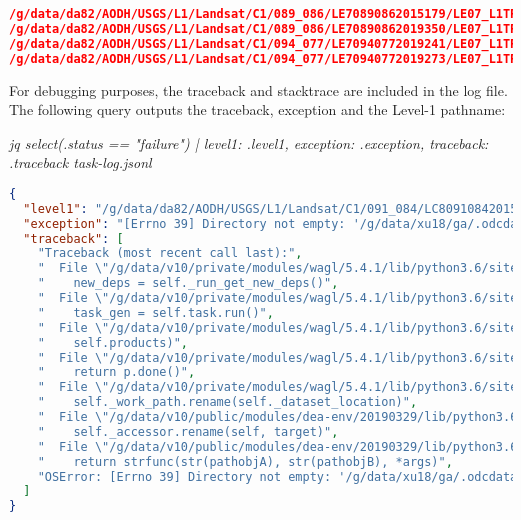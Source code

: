 \documentclass[a4paper,oneside,titlepage]{article}
\begin{document}
    \begin{lstlisting}[basicstyle=\tiny, language=json]
/g/data/da82/AODH/USGS/L1/Landsat/C1/089_086/LE70890862015179/LE07_L1TP_089086_20150628_20161024_01_T1.tar
/g/data/da82/AODH/USGS/L1/Landsat/C1/089_086/LE70890862019350/LE07_L1TP_089086_20191216_20200112_01_T1.tar
/g/data/da82/AODH/USGS/L1/Landsat/C1/094_077/LE70940772019241/LE07_L1TP_094077_20190829_20190924_01_T1.tar
/g/data/da82/AODH/USGS/L1/Landsat/C1/094_077/LE70940772019273/LE07_L1TP_094077_20190930_20191027_01_T1.tar
    \end{lstlisting}

    \begin{flushleft}
      For debugging purposes, the traceback and stacktrace are included in the log file.  The following query outputs the traceback, exception and the Level-1 pathname: \par
      \textit{{\tiny jq select(.status == "failure") |
      {level1: .level1, exception: .exception, traceback: .traceback} task-log.jsonl}}
    \end{flushleft}

    \begin{lstlisting}[basicstyle=\tiny, language=json]
{
  "level1": "/g/data/da82/AODH/USGS/L1/Landsat/C1/091_084/LC80910842015025LGN02/LC08_L1TP_091084_20150125_20180203_01_T1.tar",
  "exception": "[Errno 39] Directory not empty: '/g/data/xu18/ga/.odcdataset-z9qqc37z' -> '/g/data/xu18/ga/ga_ls8c_ard_3/091/084/2015/01/25'",
  "traceback": [
    "Traceback (most recent call last):",
    "  File \"/g/data/v10/private/modules/wagl/5.4.1/lib/python3.6/site-packages/luigi-3.0.0-py3.6.egg/luigi/worker.py\", line 191, in run",
    "    new_deps = self._run_get_new_deps()",
    "  File \"/g/data/v10/private/modules/wagl/5.4.1/lib/python3.6/site-packages/luigi-3.0.0-py3.6.egg/luigi/worker.py\", line 133, in _run_get_new_deps",
    "    task_gen = self.task.run()",
    "  File \"/g/data/v10/private/modules/wagl/5.4.1/lib/python3.6/site-packages/tesp-0.6.2-py3.6.egg/tesp/workflow.py\", line 212, in run",
    "    self.products)",
    "  File \"/g/data/v10/private/modules/wagl/5.4.1/lib/python3.6/site-packages/eodatasets3-0.9.2-py3.6.egg/eodatasets3/wagl.py\", line 563, in package",
    "    return p.done()",
    "  File \"/g/data/v10/private/modules/wagl/5.4.1/lib/python3.6/site-packages/eodatasets3-0.9.2-py3.6.egg/eodatasets3/assemble.py\", line 750, in done",
    "    self._work_path.rename(self._dataset_location)",
    "  File \"/g/data/v10/public/modules/dea-env/20190329/lib/python3.6/pathlib.py\", line 1309, in rename",
    "    self._accessor.rename(self, target)",
    "  File \"/g/data/v10/public/modules/dea-env/20190329/lib/python3.6/pathlib.py\", line 393, in wrapped",
    "    return strfunc(str(pathobjA), str(pathobjB), *args)",
    "OSError: [Errno 39] Directory not empty: '/g/data/xu18/ga/.odcdataset-z9qqc37z' -> '/g/data/xu18/ga/ga_ls8c_ard_3/091/084/2015/01/25'"
  ]
}

    \end{lstlisting}
\end{document}
